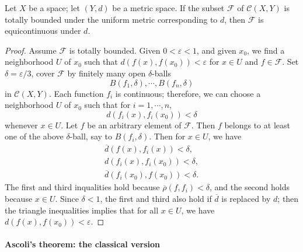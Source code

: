 \begin{lemma}
  Let \( X \) be a space;
  let \( (Y, d) \) be a metric space.
  If the subset \( \mathcal{F} \) of \( \mathcal{C}(X, Y) \) is totally bounded under the uniform metric corresponding to \( d \), then \( \mathcal{F} \) is equicontinuous under \( d \).
\end{lemma}
\begin{proof}
  Assume \( \mathcal{F} \) is totally bounded.
  Given \( 0 < \varepsilon < 1 \), and given \( x_0 \), we find a neighborhood \( U \) of \( x_0 \) such that \( d(f(x), f(x_0)) < \varepsilon \) for \( x \in U \) and \( f \in \mathcal{F} \).
  Set \( \delta = \varepsilon / 3 \), cover \( \mathcal{F} \) by finitely many open \( \delta \)-balls
  \[
    B(f_1, \delta), \cdots, B(f_n, \delta)
  \]
  in \( \mathcal{C}(X, Y) \).
  Each function \( f_i \) is continuous;
  therefore, we can choose a neighborhood \( U \) of \( x_0 \) such that for \( i = 1, \cdots, n \),
  \[
    d(f_i(x), f_i(x_0)) < \delta
  \]
  whenever \( x \in U \).
  Let \( f \) be an arbitrary element of \( \mathcal{F} \).
  Then \( f \) belongs to at least one of the above \( \delta \)-ball, say to \( B(f_i, \delta) \).
  Then for \( x \in U \), we have
  \begin{align*}
  \overline{d}(f(x), f_i(x)) < \delta,\\
  d(f_i(x), f_i(x_0)) < \delta,\\
  \overline{d}(f_i(x_0), f(x_0)) < \delta.
  \end{align*}
  The first and third inqualities hold because \( \overline{\rho}(f, f_i) < \delta \), and the second holds because \( x \in U \).
  Since \( \delta < 1 \), the first and third also hold if \( \overline{d} \) is replaced by \( d \);
  then the triangle inequalities implies that for all \( x \in U \), we have \( d(f(x), f(x_0)) < \varepsilon \).
\end{proof}

\paragraph{Ascoli's theorem: the classical version}

